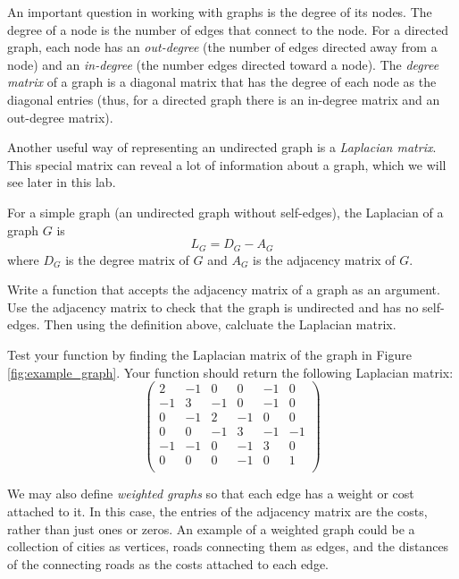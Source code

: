 An important question in working with graphs is the degree of its nodes.
The degree of a node is the number of edges that connect to the node.
For a directed graph, each node has an \emph{out-degree} (the number of edges directed away from a node) and an \emph{in-degree} (the number edges directed toward a node).
The \emph{degree matrix} of a graph is a diagonal matrix that has the degree of each node as the diagonal entries (thus, for a directed graph there is an in-degree matrix and an out-degree matrix).

Another useful way of representing an undirected graph is a \emph{Laplacian matrix}.
This special matrix can reveal a lot of information about a graph, which we will see later in this lab.
\begin{definition}
For a simple graph (an undirected graph without self-edges), the Laplacian of a graph $G$ is
\[ L_G = D_G - A_G \]
where $D_G$ is the degree matrix of $G$ and $A_G$ is the adjacency matrix of $G$.
\end{definition}


\begin{problem}
Write a function that accepts the adjacency matrix of a graph as an argument. Use the adjacency matrix to check that the graph is undirected and has no self-edges. Then using the definition above, calcluate the Laplacian matrix.

Test your function by finding the Laplacian matrix of the graph in Figure \ref{fig:example_graph}. Your function should return the following Laplacian matrix:
\[
\begin{pmatrix}
2 &-1 & 0 & 0 &-1 & 0 \\
-1 & 3 &-1 & 0 &-1 & 0 \\
0 &-1 & 2 &-1 & 0 & 0 \\
0 & 0 &-1 & 3 &-1 &-1 \\
-1 &-1 & 0 &-1 & 3 & 0 \\
0 & 0 & 0 &-1 & 0 & 1 \\
\end{pmatrix}
\]
\label{prob:laplacian}
\end{problem}


We may also define \emph{weighted graphs} so that each edge has a weight or cost attached to it.
In this case, the entries of the adjacency matrix are the costs, rather than just ones or zeros.
An example of a weighted graph could be a collection of cities as vertices, roads connecting them as edges, and the distances of the connecting roads as the costs attached to each edge.

